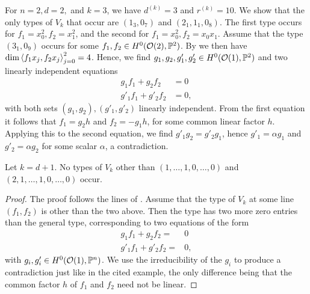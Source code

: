 \begin{example} \label{no-big-types}
	For $n=2, d=2,$ and $k=3$, we have $d^{(k)}=3$ and $r^{(k)}=10$. We show that the only types of $V_k$ that occur are $(1_3, 0_7)$ and $(2_1,1_1,0_8)$. The first type occurs \eg for $f_1 = x_0^2, f_2=x_1^2$, and the second for $f_1=x_0^2, f_2=x_0x_1$. Assume that the type $(3_1,0_9)$ occurs for some $f_1,f_2 \in H^0(\mathcal{O}(2),\mathbb{P}^2)$. By  we then have $\dim\left\langle f_1 x_j,f_2 x_j \right\rangle_{j=0}^2 = 4$. Hence, we find $g_1,g_2,g'_1,g'_2\in H^0(\mathcal{O}(1),\mathbb{P}^2)$ and two linearly independent equations
	\begin{align*}
	g_1f_1 + g_2f_2 &= 0 \\
	g'_1f_1 + g'_2f_2 &= 0,
	\end{align*}
	with both sets $(g_1,g_2), (g'_1,g'_2)$ linearly independent.
	From the first equation it follows that $f_1 = g_2 h$ and $f_2 = -g_1 h$, for some common linear factor $h$. Applying this to the second equation, we find $g'_1 g_2 = g'_2 g_1$, hence $g'_1 = \alpha g_1$ and $g'_2 = \alpha g_2$ for some scalar $\alpha$, a contradiction.
\end{example}

\begin{proposition} \label{no-big-types-general}
	Let $k=d+1$. No types of $V_k$ other than
	$(1,\dotsc,1,0,\dotsc,0)$ and $(2,1,\dotsc,1,0,\dotsc,0)$ occur. 
\end{proposition}

\begin{proof}
	The proof follows the lines of . Assume that the type of $V_k$ at some line $(f_1,f_2)$ is other than the two above. Then the type has two more zero entries than the general type, corresponding to two equations of the form
	\begin{align*}
		g_1f_1 + g_2f_2 =& 0 \\
		g'_1 f_1 + g'_2 f_2 =& 0,
	\end{align*}
	with $g_i,g'_i\in H^0(\mathcal{O}(1),\mathbb{P}^n)$. We use the irreducibility of the $g_i$ to produce a contradiction just like in the cited example, the only difference being that the common factor $h$ of $f_1$ and $f_2$ need not be linear.
\end{proof}